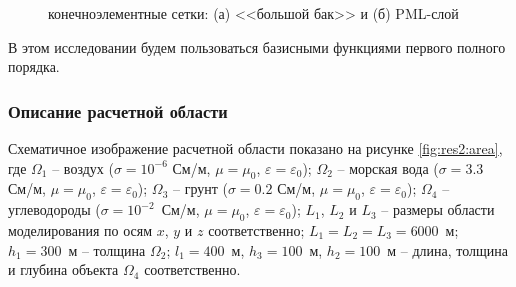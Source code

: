\documentclass[a4paper,12pt]{article}
\begin{document}
\begin{figure}[H]
	\centering
	\caption{конечноэлементные сетки: (а) <<большой бак>> и (б) PML-слой}
	\label{fig:res2:meshes}
\end{figure}

В этом исследовании будем пользоваться базисными функциями первого полного порядка.

\subsubsection{Описание расчетной области}
Схематичное изображение расчетной области показано на рисунке \ref{fig:res2:area}, где $\Omega_1$ -- воздух ($\sigma=10^{-6}$ См/м, $\mu=\mu_0$, $\varepsilon=\varepsilon_0$); $\Omega_2$ -- морская вода ($\sigma=3.3$ См/м, $\mu=\mu_0$, $\varepsilon=\varepsilon_0$); $\Omega_3$ -- грунт ($\sigma=0.2$ См/м, $\mu=\mu_0$, $\varepsilon=\varepsilon_0$); $\Omega_4$ -- углеводороды ($\sigma=10^{-2}$~См/м, $\mu=\mu_0$, $\varepsilon=\varepsilon_0$); $L_1$, $L_2$ и $L_3$ -- размеры области моделирования по осям $x$, $y$ и $z$ соответственно; $L_1 = L_2 = L_3 = 6000$~м; $h_1=300$~м -- толщина $\Omega_2$; $l_1=400$~м, $h_3=100$~м, $h_2=100$~м -- длина, толщина и глубина объекта $\Omega_4$ соответственно.
\end{document}

